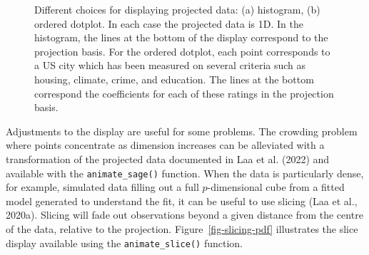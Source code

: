 \documentclass[
  letterpaper,
]{krantz}
\begin{document}
\begin{figure}
\begin{minipage}{0.40\linewidth}
\end{minipage}%

\caption{\label{fig-displays}Different choices for displaying projected
data: (a) histogram, (b) ordered dotplot. In each case the projected
data is 1D. In the histogram, the lines at the bottom of the display
correspond to the projection basis. For the ordered dotplot, each point
corresponds to a US city which has been measured on several criteria
such as housing, climate, crime, and education. The lines at the bottom
correspond the coefficients for each of these ratings in the projection
basis.}

\end{figure}%

Adjustments to the display are useful for some problems. The crowding
problem where points concentrate as dimension increases can be
alleviated with a transformation of the projected data documented in Laa
et al. (2022) and available with the \texttt{animate\_sage()} function.
When the data is particularly dense, for example, simulated data filling
out a full \(p\)-dimensional cube from a fitted model generated to
understand the fit, it can be useful to use slicing (Laa et al., 2020a).
Slicing will fade out observations beyond a given distance from the
centre of the data, relative to the projection.
Figure~\ref{fig-slicing-pdf} illustrates the slice display available
using the \texttt{animate\_slice()} function.
\end{document}

